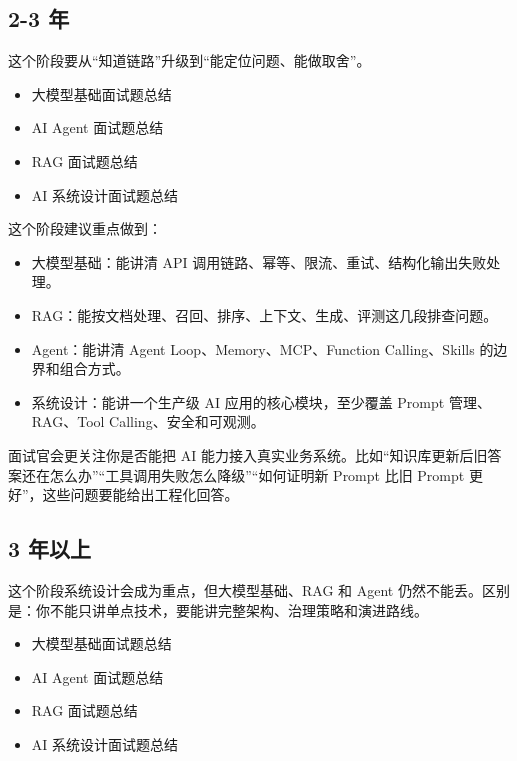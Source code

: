 \documentclass[10pt,a4paper]{ctexart}
\begin{document}
\subsection{2-3 年}


这个阶段要从“知道链路”升级到“能定位问题、能做取舍”。


\begin{itemize}[itemsep=2pt, topsep=4pt]
  \item 大模型基础面试题总结
  \item AI Agent 面试题总结
  \item RAG 面试题总结
  \item AI 系统设计面试题总结
\end{itemize}


这个阶段建议重点做到：


\begin{itemize}[itemsep=2pt, topsep=4pt]
  \item 大模型基础：能讲清 API 调用链路、幂等、限流、重试、结构化输出失败处理。
  \item RAG：能按文档处理、召回、排序、上下文、生成、评测这几段排查问题。
  \item Agent：能讲清 Agent Loop、Memory、MCP、Function Calling、Skills 的边界和组合方式。
  \item 系统设计：能讲一个生产级 AI 应用的核心模块，至少覆盖 Prompt 管理、RAG、Tool Calling、安全和可观测。
\end{itemize}


面试官会更关注你是否能把 AI 能力接入真实业务系统。比如“知识库更新后旧答案还在怎么办”“工具调用失败怎么降级”“如何证明新 Prompt 比旧 Prompt 更好”，这些问题要能给出工程化回答。



\subsection{3 年以上}


这个阶段系统设计会成为重点，但大模型基础、RAG 和 Agent 仍然不能丢。区别是：你不能只讲单点技术，要能讲完整架构、治理策略和演进路线。


\begin{itemize}[itemsep=2pt, topsep=4pt]
  \item 大模型基础面试题总结
  \item AI Agent 面试题总结
  \item RAG 面试题总结
  \item AI 系统设计面试题总结
\end{itemize}
\end{document}
